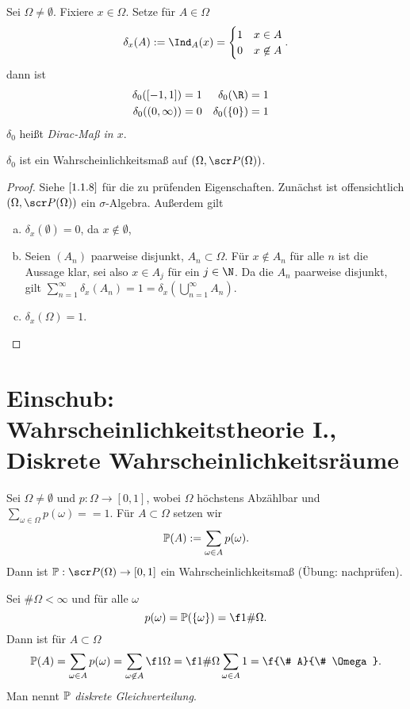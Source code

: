 \begin{ex} \label{1.1.14}
	Sei $\Omega \neq \emptyset$.
	Fixiere $x \in \Omega$.
	Setze für $A \in \Omega$
	\[
		\delta_x(A) := \Ind_A(x) = \begin{cases}
			1 & x \in A \\
			0 & x \not\in A
		\end{cases}.
	\]
	dann ist
	\begin{align*}
		\delta_0([-1,1]) &= 1 &
		\delta_0(\R) &= 1 & \\
		\delta_0((0,\infty)) &= 0 &
		\delta_0(\{0\}) &= 1
	\end{align*}
	$\delta_0$ heißt \emph{Dirac-Maß in $x$}.

	$\delta_0$ ist ein Wahrscheinlichkeitsmaß auf $(\Omega, \scr P(\Omega))$.
	\begin{proof}
		Siehe $\ref{1.1.8}$ für die zu prüfenden Eigenschaften.
		Zunächst ist offensichtlich $(\Omega, \scr P(\Omega))$ ein $\sigma$-Algebra.
		Außerdem gilt
		\begin{enumerate}[(a)]
			\item
				$\delta_x (\emptyset) = 0$, da $x \not\in \emptyset$,
			\item
				Seien $(A_n)$ paarweise disjunkt, $A_n \subset \Omega$.
				Für $x \not\in A_n$ für alle $n$ ist die Aussage klar, sei also $x \in A_j$ für ein $j \in \N$.
				Da die $A_n$ paarweise disjunkt, gilt $\sum_{n=1}^\infty \delta_x (A_n) = 1 = \delta_x (\bigcup_{n=1}^\infty A_n)$.
			\item
				$\delta_x(\Omega) = 1$.
		\end{enumerate}
	\end{proof}
\end{ex}

\section{Einschub: Wahrscheinlichkeitstheorie I., Diskrete Wahrscheinlichkeitsräume}

Sei $\Omega \neq \emptyset$ und $p: \Omega \to [0,1]$, wobei $\Omega$ höchstens Abzählbar und $\sum_{\omega \in \Omega} p(\omega) == 1$.
Für $A \subset \Omega$ setzen wir
\[
	\P(A) := \sum_{\omega \in A} p(\omega).
\]
Dann ist $\P: \scr P(\Omega) \to [0,1]$ ein Wahrscheinlichkeitsmaß (Übung: nachprüfen).

\begin{ex} \label{1.2.1}
	Sei $\# \Omega < \infty$ und für alle $\omega$
	\[
		p(\omega) = \P(\{\omega\}) = \f 1{\# \Omega}.
	\]
	Dann ist für $A \subset \Omega$
	\[
		\P(A)
		= \sum_{\omega \in A} p(\omega)
		= \sum_{\omega \not\in A} \f 1{\Omega}
		= \f 1{\# \Omega} \sum_{\omega \in A} 1
		= \f {\# A}{\# \Omega}.
	\]
	Man nennt $\P$ \emph{diskrete Gleichverteilung}.
\end{ex}

